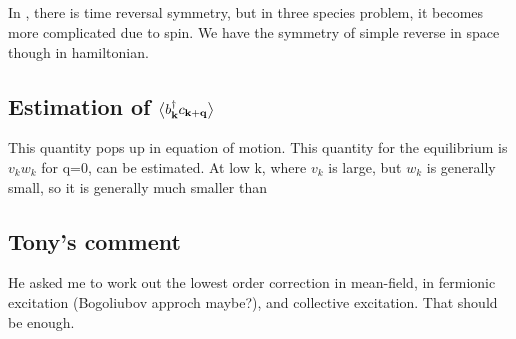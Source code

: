 \subsection{}
In \cite{AndersonBCS}, there is time reversal symmetry, but in three species problem, it becomes more complicated due to spin.  We have the symmetry of simple reverse in space though in hamiltonian.  

\subsection{Estimation of $\bigl<{b^{\dagger}_{\mathbf{k}}c_{\mathbf{k}+\mathbf{q}}}\bigr>$}
This quantity pops up in equation of motion.  This quantity for the equilibrium is $v_{k}w_{k}$ for q=0, can be estimated.  At low k, where $v_{k}$ is large, but $w_{k}$ is generally small, so it is generally much smaller than 

\subsection{Tony's comment}
He asked me to work out the lowest order correction in mean-field, in fermionic excitation (Bogoliubov approch maybe?), and collective excitation.  That should be enough. 